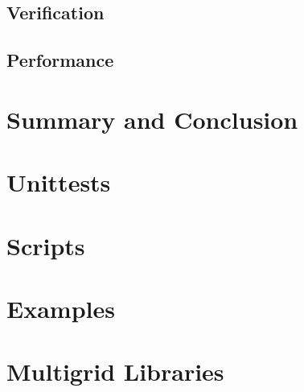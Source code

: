 \documentclass[x11names,twoside,english]{uiofysmaster}
\begin{document}
	\section{Verification}
    
    
    
    
    
    
	\section{Performance}
    
    
    

\chapter{Summary and Conclusion}
	\label{sec:summ}
	


%
\appendix
%     
%
%     
%
\chapter{Unittests}
    
\chapter{Scripts}
	
%
\chapter{Examples}
    
%     
\chapter{Multigrid Libraries}
    

%     


%
\printbibliography
\end{document}

